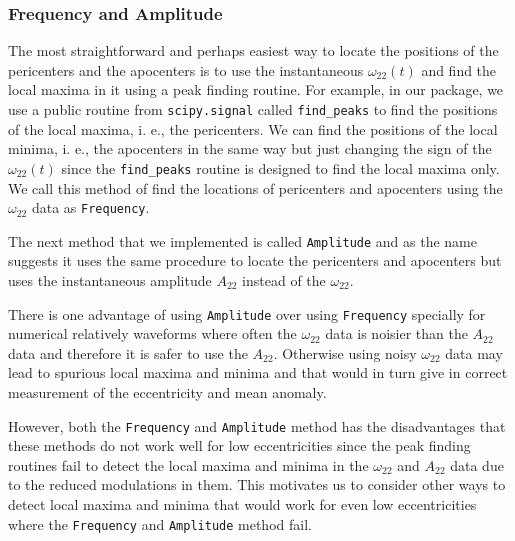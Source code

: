 \documentclass[aps,prd,amsmath,floats,floatfix, twocolumn,
superscriptaddress,nofootinbib,showpacs]{revtex4-1}
\begin{document}
\subsubsection{Frequency and Amplitude}
\label{sec:frequency-and-amplitude}
The most straightforward and perhaps easiest way to locate the positions of the
pericenters and the apocenters is to use the instantaneous
$\omega_{22}(t)$ and find the local maxima in it using a peak finding
routine. For example, in our package, we use a public routine from
\texttt{scipy.signal} called \texttt{find\_peaks} to find the positions
of the local maxima, i. e., the pericenters. We can find the positions
of the local minima, i. e., the apocenters in the same way but just
changing the sign of the $\omega_{22}(t)$ since the
\texttt{find\_peaks} routine is designed to find the local maxima
only. We call this method of find the locations of pericenters and
apocenters using the $\omega_{22}$ data as \texttt{Frequency}.

The next method that we implemented is called \texttt{Amplitude} and
as the name suggests it uses the same procedure to locate the
pericenters and apocenters but uses the instantaneous amplitude
$A_{22}$ instead of the $\omega_{22}$.

There is one advantage of using \texttt{Amplitude} over using
\texttt{Frequency} specially for numerical relatively waveforms where
often the $\omega_{22}$ data is noisier than the $A_{22}$ data and
therefore it is safer to use the $A_{22}$. Otherwise using noisy
$\omega_{22}$ data may lead to spurious local maxima and minima and
that would in turn give in correct measurement of the eccentricity and
mean anomaly.

However, both the \texttt{Frequency} and \texttt{Amplitude} method has
the disadvantages that these methods do not work well for low
eccentricities since the peak finding routines fail to detect the
local maxima and minima in the $\omega_{22}$ and $A_{22}$ data due to
the reduced modulations in them. This motivates us to consider other
ways to detect local maxima and minima that would work for even low
eccentricities where the \texttt{Frequency} and \texttt{Amplitude}
method fail.
\end{document}
